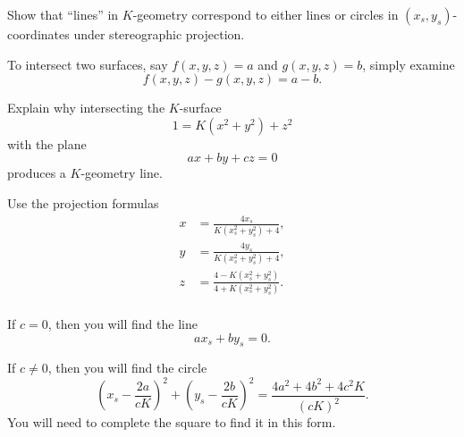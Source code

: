 \documentclass{ximera}
\begin{document}
\begin{problem}
  Show that ``lines'' in $K$-geometry correspond to either lines or
  circles in $(x_{s},y_{s})$-coordinates under stereographic
  projection.

\begin{hint}
  To intersect two surfaces, say $f(x,y,z)=a$ and $g(x,y,z)=b$,
  simply examine
  \[
  f(x,y,z)-g(x,y,z) = a-b.
  \]
\end{hint}

\begin{hint}
  Explain why intersecting the $K$-surface
  \[
  1 = K\left(x^2+y^2\right) + z^2 
  \]
  with the plane
  \[
  ax+by+cz = 0
  \]
  produces a $K$-geometry line.
\end{hint}

\begin{hint}
  Use the projection formulas
  \begin{align*}
      x &= \frac{4x_s}{K\left(x_s^2 + y_s^2\right) + 4},\\
      y &= \frac{4y_s}{K\left(x_s^2 + y_s^2\right) + 4},\\
      z &= \frac{4-K\left(x_s^2 + y_s^2\right)}{4+K\left(x_s^2 + y_s^2\right)}.\\
  \end{align*}
\end{hint}

\begin{hint}
  If $c=0$, then you will find the line
  \[
   ax_s + by_s = 0.
  \]
\end{hint}

\begin{hint}
  If $c\ne 0$, then you will find the circle
  \[
   \left(x_s - \frac{2a}{cK}\right)^2 + \left(y_s -
   \frac{2b}{cK}\right)^2 = \frac{4a^2 + 4b^2 + 4c^2K}{(cK)^2}.
   \]
   You will need to complete the square to find it in this form.
\end{hint}


\end{problem}
\end{document}
